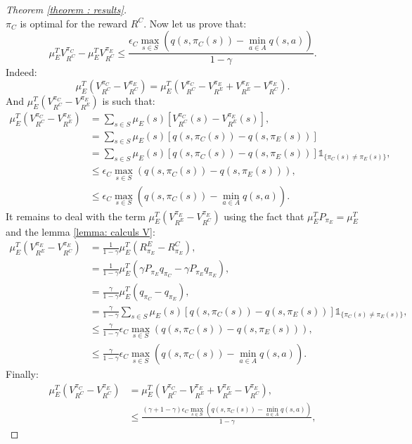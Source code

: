 \documentclass{article} %
\newcommand{\0}{\mathbf{0}}
\newcommand{\1}{\mathbf{1}}
\begin{document}
\begin{proof}[Theorem \ref{theorem : results}]
\begin{equation}
\end{equation}
$\pi_C$ is optimal for the reward $R^C$.
Now let us prove that:
\begin{equation}
\mu_E^TV^{\pi_C}_{R^C}-\mu_E^TV^{\pi_E}_{R^C}\leq\frac{\epsilon_C\max_{s\in S}(q(s,\pi_C(s))-\min_{a\in A}q(s,a))}{1-\gamma}.
\end{equation}
Indeed:
\begin{equation}
\mu_E^T(V^{\pi_C}_{R^C}-V^{\pi_E}_{R^C})=\mu_E^T(V^{\pi_C}_{R^C}-V^{\pi_E}_{R^E}+V^{\pi_E}_{R^E}-V^{\pi_E}_{R^C}).
\end{equation}
And $\mu_E^T(V^{\pi_C}_{R^C}-V^{\pi_E}_{R^E})$ is such that:
\begin{align}
\mu_E^T(V^{\pi_C}_{R^C}-V^{\pi_E}_{R^E})&=\sum_{s\in S}\mu_E(s)[V^{\pi_C}_{R^C}(s)-V^{\pi_E}_{R^E}(s)],
\\
&=\sum_{s\in S}\mu_E(s)[q(s,\pi_C(s))-q(s,\pi_E(s))]
\\
&=\sum_{s\in S}\mu_E(s)[q(s,\pi_C(s))-q(s,\pi_E(s))]\mathds{1}_{\{\pi_C(s)\neq\pi_E(s)\}},
\\
&\leq\epsilon_C\max_{s\in S}(q(s,\pi_C(s))-q(s,\pi_E(s))),
\\
&\leq\epsilon_C\max_{s\in S}(q(s,\pi_C(s))-\min_{a\in A}q(s,a)).
\end{align}
It remains to deal with the term $\mu_E^T(V^{\pi_E}_{R^E}-V^{\pi_E}_{R^C})$ using the fact that $\mu_E^TP_{\pi_E}=\mu_E^T$ and the lemma \ref{lemma: calculs V}:
\begin{align}
\mu_E^T(V^{\pi_E}_{R^E}-V^{\pi_E}_{R^C})&=\frac{1}{1-\gamma}\mu_E^T(R^E_{\pi_E}-R^C_{\pi_E}),
\\
&=\frac{1}{1-\gamma}\mu_E^T(\gamma P_{\pi_E}q_{\pi_C}-\gamma P_{\pi_E}q_{\pi_E}),
\\
&=\frac{\gamma}{1-\gamma}\mu_E^T(q_{\pi_C}-q_{\pi_E}),
\\
&=\frac{\gamma}{1-\gamma}\sum_{s\in S}\mu_E(s)[q(s,\pi_C(s))-q(s,\pi_E(s))]\mathds{1}_{\{\pi_C(s)\neq\pi_E(s)\}},
\\
&\leq\frac{\gamma}{1-\gamma}\epsilon_C\max_{s\in S}(q(s,\pi_C(s))-q(s,\pi_E(s))),
\\
&\leq\frac{\gamma}{1-\gamma}\epsilon_C\max_{s\in S}(q(s,\pi_C(s))-\min_{a\in A}q(s,a)).
\end{align}
Finally:
\begin{align}
\mu_E^T(V^{\pi_C}_{R^C}-V^{\pi_E}_{R^C})&=\mu_E^T(V^{\pi_C}_{R^C}-V^{\pi_E}_{R^E}+V^{\pi_E}_{R^E}-V^{\pi_E}_{R^C}),
\\
&\leq\frac{(\gamma+1-\gamma)\epsilon_C\max_{s\in S}(q(s,\pi_C(s))-\min_{a\in A}q(s,a))}{1-\gamma},

\end{align}
\end{proof}
\end{document}
